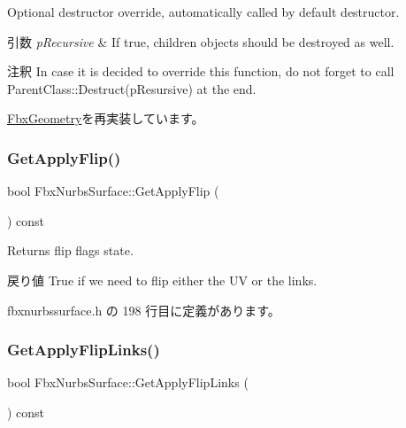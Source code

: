 Optional destructor override, automatically called by default destructor. 
\begin{DoxyParams}{引数}
{\em p\+Recursive} & If true, children objects should be destroyed as well. \\
\hline
\end{DoxyParams}
\begin{DoxyRemark}{注釈}
In case it is decided to override this function, do not forget to call Parent\+Class\+::\+Destruct(p\+Resursive) at the end. 
\end{DoxyRemark}


\hyperlink{class_fbx_geometry_a07e94f7801067d66429afbf1799795cd}{Fbx\+Geometry}を再実装しています。

\mbox{\label{class_fbx_nurbs_surface_a2fb21f20bbdbe07efdfacff8c1a9c746}} 
\subsubsection{\texorpdfstring{Get\+Apply\+Flip()}{GetApplyFlip()}}
{\footnotesize\ttfamily bool Fbx\+Nurbs\+Surface\+::\+Get\+Apply\+Flip (\begin{DoxyParamCaption}{ }\end{DoxyParamCaption}) const\hspace{0.3cm}{\ttfamily [inline]}}

Returns flip flags state. \begin{DoxyReturn}{戻り値}
{\ttfamily True} if we need to flip either the UV or the links. 
\end{DoxyReturn}


 fbxnurbssurface.\+h の 198 行目に定義があります。

\mbox{\label{class_fbx_nurbs_surface_ad772f72bf7c01a51d7c3976c4247f13d}} 
\subsubsection{\texorpdfstring{Get\+Apply\+Flip\+Links()}{GetApplyFlipLinks()}}
{\footnotesize\ttfamily bool Fbx\+Nurbs\+Surface\+::\+Get\+Apply\+Flip\+Links (\begin{DoxyParamCaption}{ }\end{DoxyParamCaption}) const}

